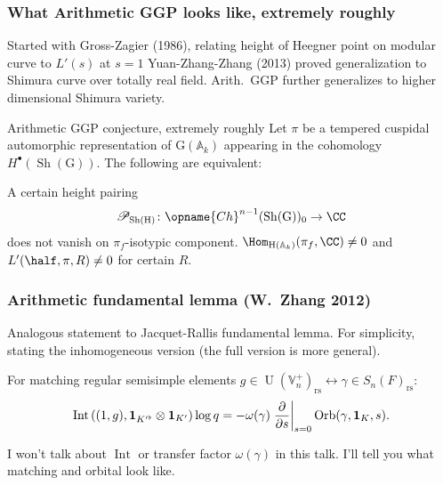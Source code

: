 \documentclass[11pt]{beamer}
\DeclareMathOperator{\Int}{Int}
\DeclareMathOperator{\Orb}{Orb}
\DeclareMathOperator{\Sh}{Sh}
\DeclareMathOperator{\U}{U}
\newcommand{\VV}{\mathbb{V}}
\newcommand{\G}{\mathrm{G}}
\renewcommand{\H}{\mathrm{H}}
\newcommand{\rs}{_{\text{rs}}}
\begin{document}
\begin{frame}
  \frametitle{What Arithmetic GGP looks like, extremely roughly}
  \begin{itemize}
  \ii Started with Gross-Zagier (1986), relating height of Heegner point on modular curve to $L'(s)$ at $s = 1$
  \ii Yuan-Zhang-Zhang (2013) proved generalization to Shimura curve over totally real field.
  \ii Arith.~GGP further generalizes to higher dimensional Shimura variety.
  \end{itemize}
  \begin{exampleblock}{Arithmetic GGP conjecture, extremely roughly}
    Let $\pi$ be a tempered cuspidal automorphic representation of $\G(\mathbb A_k)$
    appearing in the cohomology $H^\bullet(\Sh(\G))$.
    The following are equivalent:
    \begin{enumerate}
      \ii A certain height pairing
      \[ \mathscr{P}_{\Sh(\H)} \colon \opname{Ch}^{n-1}(\Sh(\G))_0 \to \CC \]
      does not vanish on $\pi_f$-isotypic component.
      \ii $\Hom_{\H(\mathbb{A}_k)}(\pi_f, \CC) \neq 0$
      and $L'(\half, \pi, R) \neq 0$ for certain $R$.
    \end{enumerate}
  \end{exampleblock}
\end{frame}

\begin{frame}
  \frametitle{Arithmetic fundamental lemma (W.\ Zhang 2012)}
  Analogous statement to Jacquet-Rallis fundamental lemma.
  For simplicity, stating the inhomogeneous version (the full version is more general).
  \begin{theorem}
  For matching regular semisimple elements
  $g \in \U(\VV_n^+)\rs \longleftrightarrow \gamma \in S_n(F)\rs$:
  \[
    \Int\left( (1,g), \mathbf{1}_{K'^\flat} \otimes \mathbf{1}_{K'} \right) \log q
    = -\omega(\gamma) \left. \pdv{}{s} \right\rvert_{s=0} \Orb(\gamma, \mathbf{1}_K, s).
  \]
  \end{theorem}
  \begin{itemize}
  \ii I won't talk about $\Int$ or transfer factor $\omega(\gamma)$ in this talk.
  \ii I'll tell you what matching and orbital look like.
  \end{itemize}
\end{frame}
\end{document}
